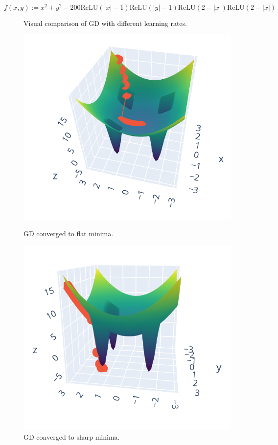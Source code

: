 \documentclass{article}
\theoremstyle{definition}
\begin{document}
$$
f(x, y):=x^2+y^2-200 \mathrm{ReLU}(|x|-1) \mathrm{ReLU}(|y|-1) \mathrm{ReLU}(2-|x|) \mathrm{ReLU}(2-|x|)
$$


\begin{figure}[h]
    \caption{Visual comparison of GD with different learning rates.}
      \includegraphics[width=\linewidth]{2d_example_flat.png}
      \caption{GD converged to flat minima.}
    \endminipage\hfill
      \includegraphics[width=\linewidth]{2d_example_sharp.png}
      \caption{GD converged to sharp minima.}
    \endminipage
\end{figure}
\end{document}
